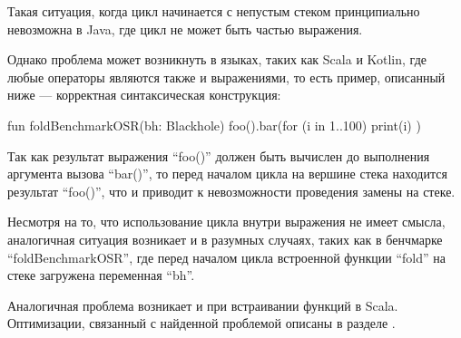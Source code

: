 \begin{verbatim}

\end{verbatim}

Такая ситуация, когда цикл начинается с непустым стеком принципиально невозможна в Java, где
цикл не может быть частью выражения.

Однако проблема может возникнуть в языках, таких как Scala и Kotlin, где любые операторы являются
также и выражениями, то есть пример, описанный ниже --- корректная синтаксическая конструкция:
\begin{pyglist}[language=kotlin]
    fun foldBenchmarkOSR(bh: Blackhole) {
        foo().bar(for (i in 1..100) { print(i) })
    }
\end{pyglist}

Так как результат выражения ``foo()'' должен быть вычислен до выполнения аргумента вызова
``bar()'', то перед началом цикла на вершине стека находится результат ``foo()'', что и приводит
к невозможности проведения замены на стеке.

Несмотря на то, что использование цикла внутри выражения не имеет смысла, аналогичная ситуация
возникает и в разумных случаях, таких как в бенчмарке ``foldBenchmarkOSR'', где перед началом
цикла встроенной функции ``fold'' на стеке загружена переменная ``bh''.

Аналогичная проблема возникает и при встраивании функций в Scala.
Оптимизации, связанный с найденной проблемой описаны в разделе . %
